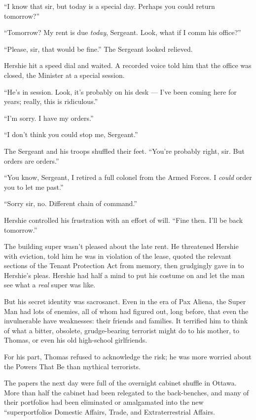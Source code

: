 ``I know that sir, but today is a special day. Perhaps you could return 
tomorrow?''

``Tomorrow? My rent is due \emph{today}, Sergeant. Look, what if I comm his 
office?''

``Please, sir, that would be fine.'' The Sergeant looked relieved.

Hershie hit a speed dial and waited. A recorded voice told him that
the office was closed, the Minister at a special session.

``He's in session. Look, it's probably on his desk --- I've been coming here 
for years; really, this is ridiculous.''

``I'm sorry. I have my orders.''

``I don't think you could stop me, Sergeant.''

The Sergeant and his troops shuffled their feet.
``You're probably right, sir. But orders are orders.''

``You know, Sergeant, I retired a full colonel from the Armed Forces. I 
\emph{could} order you to let me past.''

``Sorry sir, no. Different chain of command.''

Hershie controlled his frustration with an effort of will.
``Fine then. I'll be back tomorrow.''

\tb

The building super wasn't pleased about the late rent. He
threatened Hershie with eviction, told him he was in violation of
the lease, quoted the relevant sections of the Tenant Protection
Act from memory, then grudgingly gave in to Hershie's pleas.
Hershie had half a mind to put his costume on and let the man see
what a \emph{real} super was like.

But his secret identity was sacrosanct. Even in the era of Pax
Aliena, the Super Man had lots of enemies, all of whom had figured
out, long before, that even the invulnerable have weaknesses: their
friends and families. It terrified him to think of what a bitter,
obsolete, grudge-bearing terrorist might do to his mother, to
Thomas, or even his old high-school girlfriends.

For his part, Thomas refused to acknowledge the risk; he was more
worried about the Powers That Be than mythical terrorists.

The papers the next day were full of the overnight cabinet shuffle
in Ottawa. More than half the cabinet had been relegated to the
back-benches, and many of their portfolios had been eliminated or
amalgamated into the new ``superportfolios Domestic Affairs,
Trade, and Extraterrestrial Affairs.

